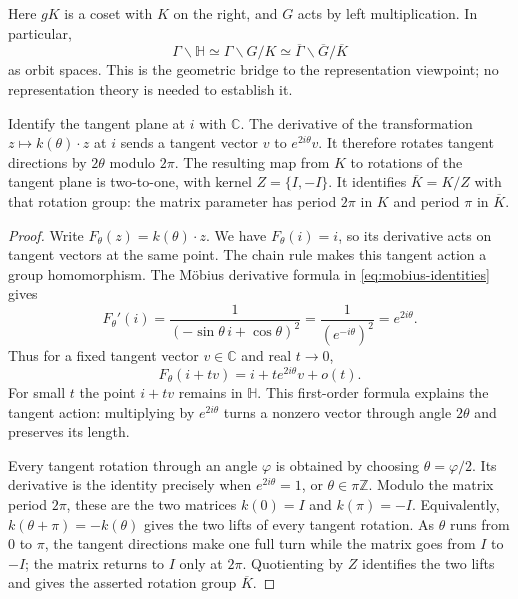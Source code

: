 Here $gK$ is a coset with $K$ on the right, and $G$ acts by left multiplication. In particular,
\[
 \Gamma\backslash\mathbb H\simeq\Gamma\backslash G/K
 \simeq\overline\Gamma\backslash\overline G/\overline K
\]
as orbit spaces. This is the geometric bridge to the representation viewpoint; no representation theory is needed to establish it.

\begin{proposition}\label{hyperbolic.angular-cover}
Identify the tangent plane at $i$ with $\mathbb C$. The derivative of the transformation $z\mapsto k(\theta)\cdot z$ at $i$ sends a tangent vector $v$ to $e^{2i\theta}v$. It therefore rotates tangent directions by $2\theta$ modulo $2\pi$. The resulting map from $K$ to rotations of the tangent plane is two-to-one, with kernel $Z=\{I,-I\}$. It identifies $\overline K=K/Z$ with that rotation group: the matrix parameter has period $2\pi$ in $K$ and period $\pi$ in $\overline K$.
\end{proposition}

\begin{proof}
Write $F_\theta(z)=k(\theta)\cdot z$. We have $F_\theta(i)=i$, so its derivative acts on tangent vectors at the same point. The chain rule makes this tangent action a group homomorphism. The Möbius derivative formula in \eqref{eq:mobius-identities} gives
\begin{equation}\label{eq:stabilizer-derivative}
 F_\theta'(i)
 =\frac1{(-\sin\theta\,i+\cos\theta)^2}
 =\frac1{(e^{-i\theta})^2}
 =e^{2i\theta}.
\end{equation}
Thus for a fixed tangent vector $v\in\mathbb C$ and real $t\to0$,
\[
 F_\theta(i+tv)=i+t e^{2i\theta}v+o(t).
\]
For small $t$ the point $i+tv$ remains in $\mathbb H$. This first-order formula explains the tangent action: multiplying by $e^{2i\theta}$ turns a nonzero vector through angle $2\theta$ and preserves its length.

Every tangent rotation through an angle $\varphi$ is obtained by choosing $\theta=\varphi/2$. Its derivative is the identity precisely when $e^{2i\theta}=1$, or $\theta\in\pi\mathbb Z$. Modulo the matrix period $2\pi$, these are the two matrices $k(0)=I$ and $k(\pi)=-I$. Equivalently, $k(\theta+\pi)=-k(\theta)$ gives the two lifts of every tangent rotation. As $\theta$ runs from $0$ to $\pi$, the tangent directions make one full turn while the matrix goes from $I$ to $-I$; the matrix returns to $I$ only at $2\pi$. Quotienting by $Z$ identifies the two lifts and gives the asserted rotation group $\overline K$.
\end{proof}
